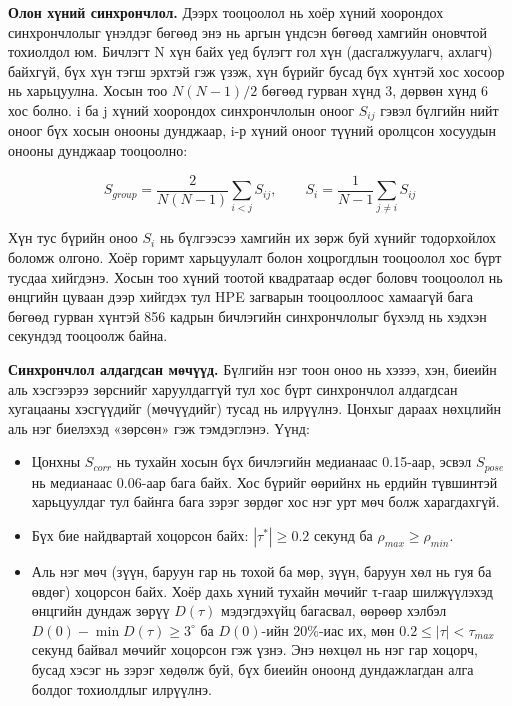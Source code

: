 \textbf{Олон хүний синхрончлол.} Дээрх тооцоолол нь хоёр хүний хоорондох синхрончлолыг үнэлдэг бөгөөд энэ нь аргын үндсэн бөгөөд хамгийн оновчтой тохиолдол юм. Бичлэгт N хүн байх үед бүлэгт гол хүн (дасгалжуулагч, ахлагч) байхгүй, бүх хүн тэгш эрхтэй гэж үзэж, хүн бүрийг бусад бүх хүнтэй хос хосоор нь харьцуулна. Хосын тоо \(N(N-1)/2\) бөгөөд гурван хүнд 3, дөрвөн хүнд 6 хос болно. i ба j хүний хоорондох синхрончлолын оноог \(S_{ij}\) гэвэл бүлгийн нийт оноог бүх хосын онооны дунджаар, i-р хүний оноог түүний оролцсон хосуудын онооны дунджаар тооцоолно:

\begin{equation}
S_{group} = \frac{2}{N(N-1)} \sum_{i<j} S_{ij}, \qquad S_i = \frac{1}{N-1} \sum_{j \ne i} S_{ij}
\end{equation}

Хүн тус бүрийн оноо \(S_i\) нь бүлгээсээ хамгийн их зөрж буй хүнийг тодорхойлох боломж олгоно. Хоёр горимт харьцуулалт болон хоцрогдлын тооцоолол хос бүрт тусдаа хийгдэнэ. Хосын тоо хүний тоотой квадратаар өсдөг боловч тооцоолол нь өнцгийн цуваан дээр хийгдэх тул HPE загварын тооцооллоос хамаагүй бага бөгөөд гурван хүнтэй 856 кадрын бичлэгийн синхрончлолыг бүхэлд нь хэдхэн секундэд тооцоолж байна.

\textbf{Синхрончлол алдагдсан мөчүүд.} Бүлгийн нэг тоон оноо нь хэзээ, хэн, биеийн аль хэсгээрээ зөрснийг харуулдаггүй тул хос бүрт синхрончлол алдагдсан хугацааны хэсгүүдийг (мөчүүдийг) тусад нь илрүүлнэ. Цонхыг дараах нөхцлийн аль нэг биелэхэд «зөрсөн» гэж тэмдэглэнэ. Үүнд:

\begin{itemize}
\item
  Цонхны \(S_{corr}\) нь тухайн хосын бүх бичлэгийн медианаас 0.15-аар, эсвэл \(S_{pose}\) нь медианаас 0.06-аар бага байх. Хос бүрийг өөрийнх нь ердийн түвшинтэй харьцуулдаг тул байнга бага зэрэг зөрдөг хос нэг урт мөч болж харагдахгүй.
\item
  Бүх бие найдвартай хоцорсон байх: \(|\tau^{*}| \ge 0.2\) секунд ба \(\rho_{max} \ge \rho_{min}\).
\item
  Аль нэг мөч (зүүн, баруун гар нь тохой ба мөр, зүүн, баруун хөл нь гуя ба өвдөг) хоцорсон байх. Хоёр дахь хүний тухайн мөчийг τ-гаар шилжүүлэхэд өнцгийн дундаж зөрүү \(D(\tau)\) мэдэгдэхүйц багасвал, өөрөөр хэлбэл \(D(0) - \min D(\tau) \ge 3^{\circ}\) ба \(D(0)\)-ийн 20\%-иас их, мөн \(0.2 \le |\tau| < \tau_{max}\) секунд байвал мөчийг хоцорсон гэж үзнэ. Энэ нөхцөл нь нэг гар хоцорч, бусад хэсэг нь зэрэг хөдөлж буй, бүх биеийн оноонд дундажлагдан алга болдог тохиолдлыг илрүүлнэ.
\end{itemize}

